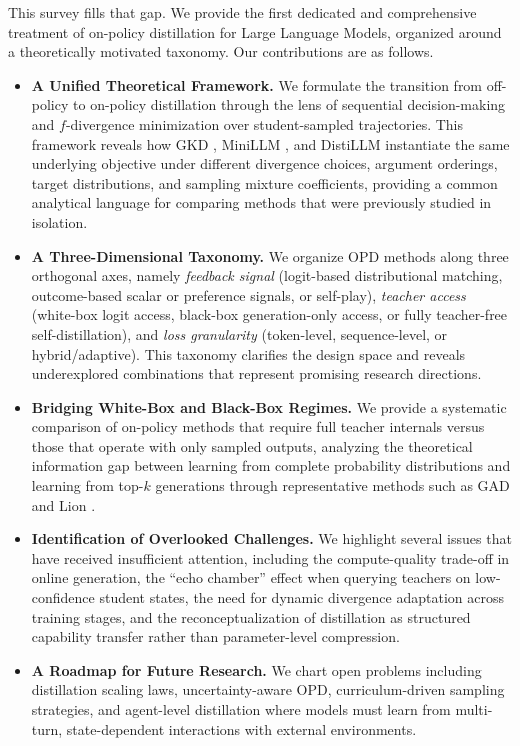 \documentclass{article} %
\begin{document}
This survey fills that gap. We provide the first dedicated and comprehensive treatment of on-policy distillation for Large Language Models, organized around a theoretically motivated taxonomy. Our contributions are as follows.
\begin{itemize}
    \item \textbf{A Unified Theoretical Framework.} We formulate the transition from off-policy to on-policy distillation through the lens of sequential decision-making and $f$-divergence minimization over student-sampled trajectories. This framework reveals how GKD \citep{2306.13649}, MiniLLM \citep{2306.08543}, and DistiLLM \citep{2402.03898} instantiate the same underlying objective under different divergence choices, argument orderings, target distributions, and sampling mixture coefficients, providing a common analytical language for comparing methods that were previously studied in isolation.
    \item \textbf{A Three-Dimensional Taxonomy.} We organize OPD methods along three orthogonal axes, namely \textit{feedback signal} (logit-based distributional matching, outcome-based scalar or preference signals, or self-play), \textit{teacher access} (white-box logit access, black-box generation-only access, or fully teacher-free self-distillation), and \textit{loss granularity} (token-level, sequence-level, or hybrid/adaptive). This taxonomy clarifies the design space and reveals underexplored combinations that represent promising research directions.
    \item \textbf{Bridging White-Box and Black-Box Regimes.} We provide a systematic comparison of on-policy methods that require full teacher internals versus those that operate with only sampled outputs, analyzing the theoretical information gap between learning from complete probability distributions and learning from top-$k$ generations through representative methods such as GAD \citep{2511.10643} and Lion \citep{2305.12870}.
    \item \textbf{Identification of Overlooked Challenges.} We highlight several issues that have received insufficient attention, including the compute-quality trade-off in online generation, the ``echo chamber'' effect when querying teachers on low-confidence student states, the need for dynamic divergence adaptation across training stages, and the reconceptualization of distillation as structured capability transfer rather than parameter-level compression.
    \item \textbf{A Roadmap for Future Research.} We chart open problems including distillation scaling laws, uncertainty-aware OPD, curriculum-driven sampling strategies, and agent-level distillation where models must learn from multi-turn, state-dependent interactions with external environments.
\end{itemize}
\end{document}
